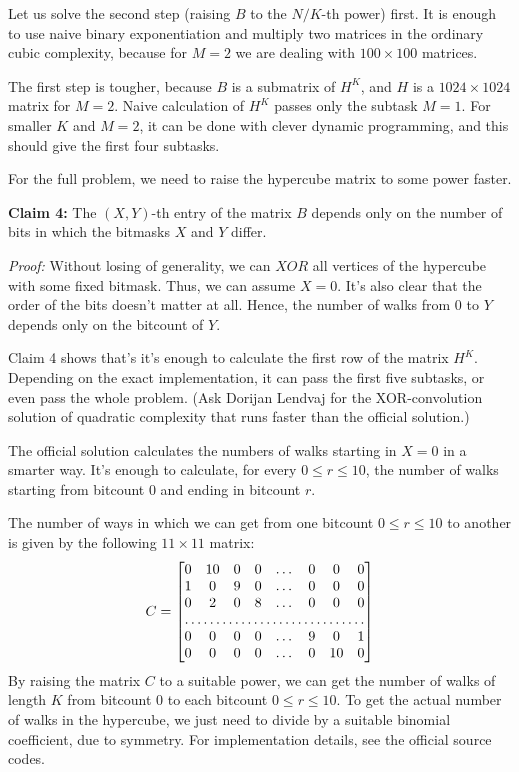 Let us solve the second step (raising $B$ to the $N/K$-th power) first.
It is enough to use naive binary exponentiation and multiply two matrices
in the ordinary cubic complexity, because for $M=2$ we are dealing with $100
\times 100$ matrices.

The first step is tougher, because $B$ is a submatrix of $H^K$, and $H$ is a
$1024 \times 1024$ matrix for $M=2$. Naive calculation of $H^K$ passes only the
subtask $M=1$. For smaller $K$ and $M=2$, it can be done with clever dynamic
programming, and this should give the first four subtasks.

For the full problem, we need to raise the hypercube matrix to some power
faster.

\textbf{Claim 4:} The $(X, Y)$-th entry of the matrix $B$ depends only on the
number of bits in which the bitmasks $X$ and $Y$ differ.

\textit{Proof:} Without losing of generality, we can $XOR$ all vertices of the
hypercube with some fixed bitmask. Thus, we can assume $X = 0$.
It's also clear that the order of the bits doesn't matter at all.
Hence, the number of walks from $0$ to $Y$ depends only on the bitcount of $Y$.

Claim 4 shows that's it's enough to calculate the first row of the matrix $H^K$.
Depending on the exact implementation, it can pass the first five subtasks, or
even pass the whole problem. (Ask Dorijan Lendvaj for the XOR-convolution 
solution of quadratic complexity that runs faster than the official solution.)

The official solution calculates the numbers of walks starting in $X=0$ 
in a smarter way. It's enough to calculate, for every $0 \le r \le 10$,
 the number of walks starting from bitcount $0$ and ending in bitcount $r$.

The number of ways in which we can get from one bitcount $0 \le r \le 10$ to
another is given by the following $11 \times 11$ matrix:
\[
  C =
\begin{bmatrix}
  0       & 10 & 0 & 0 & \dots  & 0 & 0 & 0 \\
    1       & 0 & 9 & 0 & \dots & 0 & 0 & 0 \\
    0       & 2 & 0 & 8 & \dots & 0 & 0 & 0 \\
    \hdotsfor{8} \\
    0       & 0 & 0 & 0 & \dots & 9 & 0 & 1 \\
    0       & 0 & 0 & 0 & \dots & 0 & 10 & 0 \\
\end{bmatrix}
\]
By raising the matrix $C$ to a suitable power, we can get the number of walks of
length $K$ from bitcount $0$ to each bitcount $0 \le r \le 10$.
To get the actual number of walks in the hypercube, we just need to divide by a
suitable binomial coefficient, due to symmetry.
For implementation details, see the official source codes.

